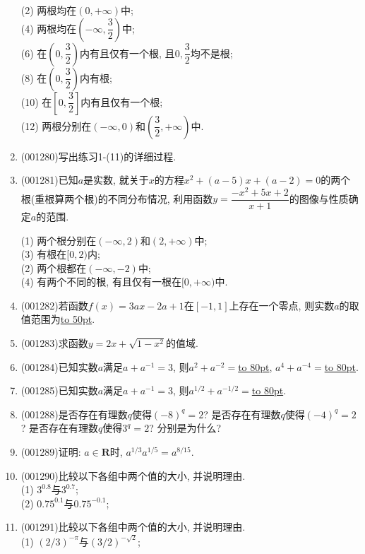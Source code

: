 \documentclass[10pt,a4paper]{article}
\newcommand{\blank}[1]{\underline{\hbox to #1pt{}}}
\begin{document}
\begin{enumerate}[1.]
\begin{multicols}{2}
(2) 两根均在$(0,+\infty)$中;\\ 
(4) 两根均在$(-\infty,\dfrac{3}{2})$中;\\ 
(6) 在$(0,\dfrac{3}{2})$内有且仅有一个根, 且$0,\dfrac{3}{2}$均不是根;\\ 
(8) 在$(0,\dfrac{3}{2})$内有根;\\ 
(10) 在$[0,\dfrac{3}{2}]$内有且仅有一个根;\\ 
(12) 两根分别在$(-\infty,0)$和$(\dfrac{3}{2},+\infty)$中.\\ 
\end{multicols}
\item {\tiny (001280)}写出练习1-(11)的详细过程.
\item {\tiny (001281)}已知$a$是实数, 就关于$x$的方程$x^2+(a-5)x+(a-2)=0$的两个根(重根算两个根)的不同分布情况, 利用函数$y=\dfrac{-x^2+5x+2}{x+1}$的图像与性质确定$a$的范围.\\ 
\begin{multicols}{2}
(1) 两个根分别在$(-\infty,2)$和$(2,+\infty)$中;\\ 
(3) 有根在$[0,2)$内;\\ 
(2) 两个根都在$(-\infty,-2)$中;\\ 
(4) 有两个不同的根, 有且仅有一根在$[0,+\infty)$中.\\ 
\end{multicols}
\item {\tiny (001282)}若函数$f(x)=3ax-2a+1$在$[-1,1]$上存在一个零点, 则实数$a$的取值范围为\blank{50}.
\item {\tiny (001283)}求函数$y=2x+\sqrt{1-x^2}$的值域.
\item {\tiny (001284)}已知实数$a$满足$a+a^{-1}=3$, 则$a^2+a^{-2}=$\blank{80}, $a^4+a^{-4}=$\blank{80}.
\item {\tiny (001285)}已知实数$a$满足$a+a^{-1}=3$, 则$a^{1/2}+a^{-1/2}=$\blank{80}.
\item {\tiny (001288)}是否存在有理数$q$使得$(-8)^q=2$? 是否存在有理数$q$使得$(-4)^q=2$? 是否存在有理数$q$使得$3^q=2$? 分别是为什么?
\item {\tiny (001289)}证明: $a\in \mathbf{R}$时, $a^{1/3}a^{1/5}=a^{8/15}$.
\item {\tiny (001290)}比较以下各组中两个值的大小, 并说明理由.\\ 
(1) $3^{0.8}$与$3^{0.7}$;\\ 
(2) $0.75^{0.1}$与$0.75^{-0.1}$;
\item {\tiny (001291)}比较以下各组中两个值的大小, 并说明理由.\\ 
(1) $(2/3)^{-\pi}$与$(3/2)^{-\sqrt{2}}$;\\ 

\end{enumerate}
\end{document}
